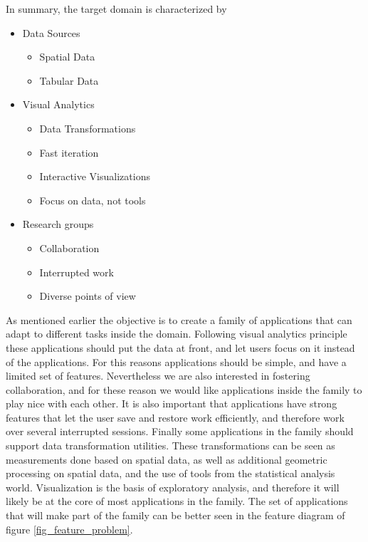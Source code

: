 \bigskip

In summary, the target domain is characterized by
\begin{itemize}
\item Data Sources
\begin{itemize}
\item Spatial Data
\item Tabular Data
\end{itemize}
\item Visual Analytics
\begin{itemize}
\item Data Transformations
\item Fast iteration
\item Interactive Visualizations
\item Focus on data, not tools
\end{itemize}
\item Research groups
\begin{itemize}
\item Collaboration
\item Interrupted work
\item Diverse points of view
\end{itemize}
\end{itemize}

As mentioned earlier the objective is to create a family of applications that can adapt to different tasks inside the domain. Following visual analytics principle these applications should put the data at front, and let users focus on it instead of the applications. For this reasons applications should be simple, and have a limited set of features. Nevertheless we are also interested in fostering collaboration, and for these reason we would like applications inside the family to play nice with each other. It is also important that applications have strong features that let the user save and restore work efficiently, and therefore work over several interrupted sessions. Finally some applications in the family should support data transformation utilities. These transformations can be seen as measurements done based on spatial data, as well as additional geometric processing on spatial data, and the use of tools from the statistical analysis world. Visualization is the basis of exploratory analysis, and therefore it will likely be at the core of most applications in the family. The set of applications that will make part of the family can be better seen in the feature diagram of figure \ref{fig_feature_problem}.


